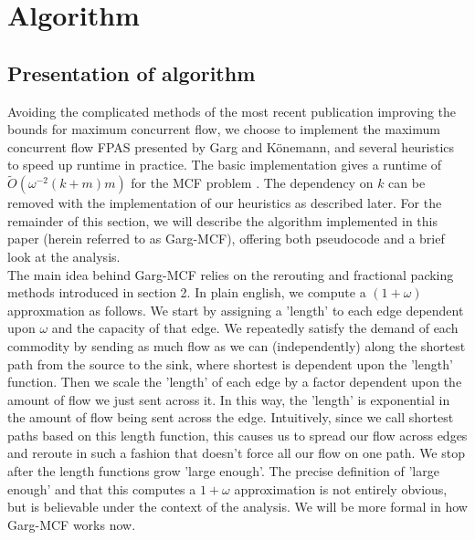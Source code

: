 \section{Algorithm}
\subsection{Presentation of algorithm}
Avoiding the complicated methods of the most recent publication
improving the bounds for maximum concurrent flow, we choose to
implement the maximum concurrent flow FPAS presented by Garg and
K\"{o}nemann, and several heuristics to speed up runtime in
practice. The basic implementation gives a runtime of
$\tilde{O}(\omega^{-2}(k+m)m)$ for the MCF problem \cite{garg}. The dependency on $k$
can be removed with
the implementation of our heuristics as described later. For the
remainder of this section, we will describe the algorithm implemented
in this paper (herein referred to as Garg-MCF), offering both
pseudocode and a brief look at the analysis. \\
The main idea behind Garg-MCF relies on the rerouting and fractional
packing methods introduced in section 2. In plain english, we compute a $(1+\omega)$ approxmation as follows. We start by assigning a 'length' to each edge
dependent upon $\omega$ and
the capacity of that edge. We repeatedly satisfy the
demand of each commodity by sending as much flow as we can
(independently) along the
shortest path from the source to the sink, where shortest is dependent
upon the 'length' function. Then we scale the 'length' of each edge by
a factor dependent upon the amount of flow we just sent across it. In
this way, the 'length' is exponential in the amount of flow being sent
across the edge. Intuitively, since we call shortest paths based on
this length function, this causes us to spread our flow across edges
and reroute in such a fashion that doesn't force all our flow on one
path. We stop after the length functions grow 'large enough'. The
precise definition of 'large enough' and that this computes a $1+\omega$ approximation is not
entirely obvious, but is believable under the context of the
analysis. We will be more formal in how Garg-MCF works
now.

